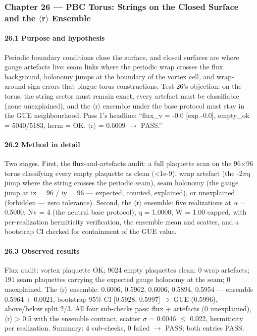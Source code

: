 \documentclass[10pt]{article}
\begin{document}
\subsubsection{Chapter 26 --- PBC Torus: Strings on the Closed Surface and the $\langle$r$\rangle$ Ensemble}

\paragraph{26.1 Purpose and hypothesis}

Periodic boundary conditions close the surface, and closed surfaces are where gauge artefacts live: seam links where the periodic wrap crosses the flux background, holonomy jumps at the boundary of the vortex cell, and wrap-around sign errors that plague torus constructions. Test 26's objection: on the torus, the string sector must remain exact, every artefact must be classifiable (none unexplained), and the $\langle$r$\rangle$ ensemble under the base protocol must stay in the GUE neighbourhood. Pass 1's headline: ``flux\_v = -0.0 [exp -0.0], empty\_ok = 5040/5183, herm = OK, $\langle$r$\rangle$ = 0.6009 $\rightarrow$ PASS.''

\paragraph{26.2 Method in detail}

Two stages. First, the flux-and-artefacts audit: a full plaquette scan on the 96$\times$96 torus classifying every empty plaquette as clean (<1e-9), wrap artefact (the -2$\pi$q jump where the string crosses the periodic seam), seam holonomy (the gauge jump at ix = 96 / iy = 96 --- expected, counted, explained), or unexplained (forbidden --- zero tolerance). Second, the $\langle$r$\rangle$ ensemble: five realizations at $\alpha$ = 0.5000, Nv = 4 (the neutral base protocol), q = 1.0000, W = 1.00 capped, with per-realization hermiticity verification, the ensemble mean and scatter, and a bootstrap CI checked for containment of the GUE value.

\paragraph{26.3 Observed results}

Flux audit: vortex plaquette OK; 9024 empty plaquettes clean; 0 wrap artefacts; 191 seam plaquettes carrying the expected gauge holonomy at the seam; 0 unexplained. The $\langle$r$\rangle$ ensemble: 0.6006, 0.5962, 0.6006, 0.5894, 0.5954 --- ensemble 0.5964 $\pm$ 0.0021, bootstrap 95\% CI [0.5928, 0.5997] $\ni$ GUE (0.5996), above/below split 2/3. All four sub-checks pass: flux + artefacts (0 unexplained), $\langle$r$\rangle$ > 0.5 with the ensemble contract, scatter $\sigma$ = 0.0046 $\le$ 0.022, hermiticity per realization. Summary: 4 sub-checks, 0 failed $\rightarrow$ PASS; both entries PASS.
\end{document}

